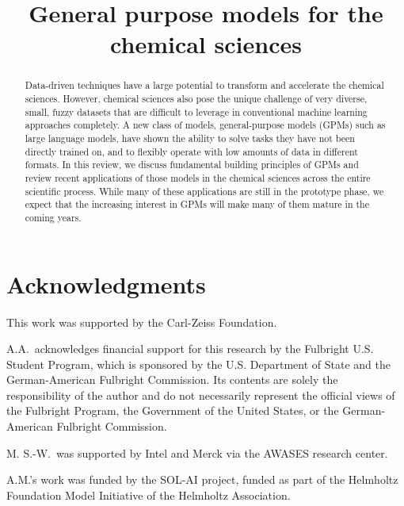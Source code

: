 \documentclass[11pt, oneside]{article}
\title{\textsf{General purpose models for the chemical sciences}}
\begin{document}
\maketitle

\begin{abstract}
    \noindent Data-driven techniques have a large potential to transform and accelerate the chemical sciences. 
    However, chemical sciences also pose the unique challenge of very diverse, small, fuzzy datasets that are difficult to leverage in conventional machine learning approaches completely. 
    A new class of models, general-purpose models (GPMs) such as large language models, have shown the ability to solve tasks they have not been directly trained on, and to flexibly operate with low amounts of data in different formats.
    In this review, we discuss fundamental building principles of GPMs and review recent applications of those models in the chemical sciences across the entire scientific process.
    While many of these applications are still in the prototype phase, we expect that the increasing interest in GPMs will make many of them mature in the coming years. 
\end{abstract}

\tableofcontents

\clearpage 

  






\section*{Acknowledgments}

This work was supported by the Carl-Zeiss Foundation. 

\noindent A.A.\ acknowledges financial support for this research by the Fulbright U.S. Student Program, which is sponsored by the U.S. Department of State and the German-American Fulbright Commission. Its contents are solely the responsibility of the author and do not necessarily represent the official views of the Fulbright Program, the Government of the United States, or the German-American Fulbright Commission. 
 
\noindent M. S.-W.\ was supported by Intel and Merck via the AWASES research center. 

\noindent A.M.'s work was funded by the SOL-AI project, funded as part of the Helmholtz Foundation Model Initiative of the Helmholtz Association. 
\end{document}
